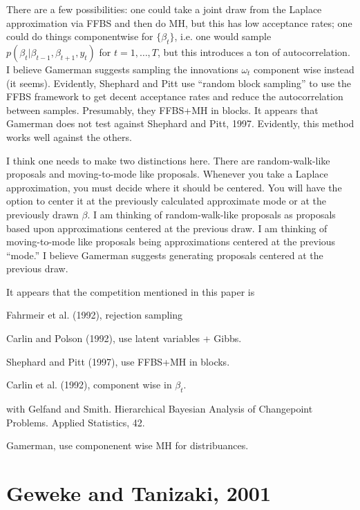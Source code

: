 \documentclass{article}
\begin{document}
There are a few possibilities: one could take a joint draw from the Laplace
approximation via FFBS and then do MH, but this has low acceptance rates; one
could do things componentwise for $\{\beta_t\}$, i.e. one would sample
$p(\beta_t | \beta_{t-1}, \beta_{t+1}, y_t)$ for $t=1, \ldots, T$, but this
introduces a ton of autocorrelation.  I believe Gamerman suggests sampling the
innovations $\omega_t$ component wise instead (it seems).  Evidently, Shephard
and Pitt use ``random block sampling'' to use the FFBS framework to get decent
acceptance rates and reduce the autocorrelation between samples.  Presumably,
they FFBS+MH in blocks.  It appears that Gamerman does not test against Shephard
and Pitt, 1997.  Evidently, this method works well against the others.

I think one needs to make two distinctions here.  There are random-walk-like
proposals and moving-to-mode like proposals.  Whenever you take a Laplace
approximation, you must decide where it should be centered.  You will have the
option to center it at the previously calculated approximate mode or at the
previously drawn $\beta$.  I am thinking of random-walk-like proposals as
proposals based upon approximations centered at the previous draw.  I am
thinking of moving-to-mode like proposals being approximations centered at the
previous ``mode.''  I believe Gamerman suggests generating proposals centered at
the previous draw.

\begin{outline}

\1 It appears that the competition mentioned in this paper is

  \2 Fahrmeir et al. (1992), rejection sampling

  \2 Carlin and Polson (1992), use latent variables + Gibbs.

  \2 Shephard and Pitt (1997), use FFBS+MH in blocks.

  \2 Carlin et al. (1992), component wise in $\beta_t$.

  with Gelfand and Smith.  Hierarchical Bayesian Analysis of Changepoint
  Problems.  Applied Statistics, 42.

  \2 Gamerman, use componenent wise MH for distribuances.  

\end{outline}

\section{Geweke and Tanizaki, 2001}
\end{document}
